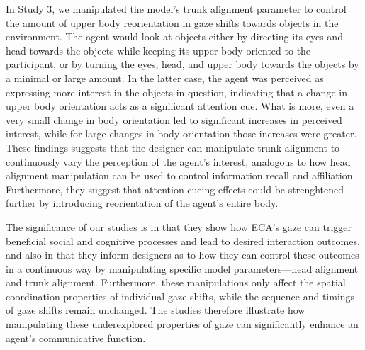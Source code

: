 In Study 3, we manipulated the model's trunk alignment parameter to control the amount of upper body reorientation in gaze shifts towards objects in the environment. The agent would look at objects either by directing its eyes and head towards the objects while keeping its upper body oriented to the participant, or by turning the eyes, head, and upper body towards the objects by a minimal or large amount. In the latter case, the agent was perceived as expressing  more interest in the objects in question, indicating that a change in upper body orientation acts as a significant attention cue. What is more, even a very small change in body orientation led to significant increases in perceived interest, while for large changes in body orientation those increases were greater. These findings suggests that the designer can manipulate trunk alignment to continuously vary the perception of the agent's interest, analogous to how head alignment manipulation can be used to control information recall and affiliation. Furthermore, they suggest that attention cueing effects could be strenghtened further by introducing reorientation of the agent's entire body.

The significance of our studies is in that they show how ECA's gaze can trigger beneficial social and cognitive processes and lead to desired interaction outcomes, and also in that they inform designers as to how they can control these outcomes in a continuous way by manipulating specific model parameters---head alignment and trunk alignment. Furthermore, these manipulations only affect the spatial coordination properties of individual gaze shifts, while the sequence and timings of gaze shifts remain unchanged. The studies therefore illustrate how manipulating these underexplored properties of gaze can significantly enhance an agent's communicative function.

